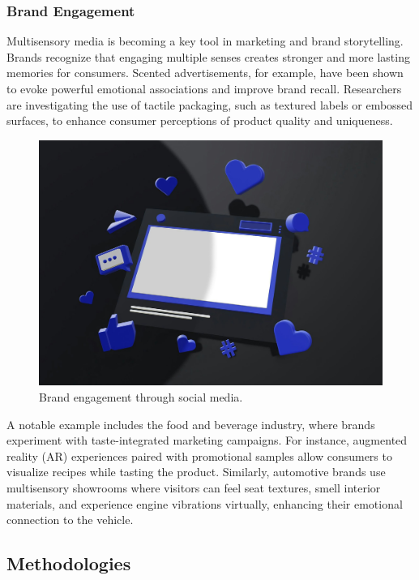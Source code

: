 \documentclass[
]{book}
\begin{document}
\subsubsection{Brand Engagement}\label{brand-engagement}

Multisensory media is becoming a key tool in marketing and brand storytelling. Brands recognize that engaging multiple senses creates stronger and more lasting memories for consumers. Scented advertisements, for example, have been shown to evoke powerful emotional associations and improve brand recall. Researchers are investigating the use of tactile packaging, such as textured labels or embossed surfaces, to enhance consumer perceptions of product quality and uniqueness.

\begin{figure}
\centering
\includegraphics[width=1\textwidth,height=\textheight]{images/engagement.jpg}
\caption{Brand engagement through social media.}
\end{figure}

A notable example includes the food and beverage industry, where brands experiment with taste-integrated marketing campaigns. For instance, augmented reality (AR) experiences paired with promotional samples allow consumers to visualize recipes while tasting the product. Similarly, automotive brands use multisensory showrooms where visitors can feel seat textures, smell interior materials, and experience engine vibrations virtually, enhancing their emotional connection to the vehicle.

\subsection{Methodologies}\label{methodologies}
\end{document}
